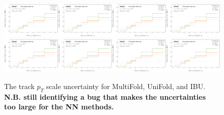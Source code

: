 \begin{figure}[h!]
\includegraphics[width=0.25\textwidth,page=68]{figures/SimResults/TrackJet_SystEffect.pdf}\includegraphics[width=0.25\textwidth,page=72]{figures/SimResults/TrackJet_SystEffect.pdf}\includegraphics[width=0.25\textwidth,page=76]{figures/SimResults/TrackJet_SystEffect.pdf}\includegraphics[width=0.25\textwidth,page=80]{figures/SimResults/TrackJet_SystEffect.pdf}\\
\includegraphics[width=0.25\textwidth,page=84]{figures/SimResults/TrackJet_SystEffect.pdf}\includegraphics[width=0.25\textwidth,page=88]{figures/SimResults/TrackJet_SystEffect.pdf}\includegraphics[width=0.25\textwidth,page=92]{figures/SimResults/TrackJet_SystEffect.pdf}\includegraphics[width=0.25\textwidth,page=96]{figures/SimResults/TrackJet_SystEffect.pdf}
\caption{The track $p_T$ scale uncertainty for MultiFold, UniFold, and IBU.  \textbf{N.B. still identifying a bug that makes the uncertainties too large for the NN methods.}}
\label{fig:simresultsmulti_trackjetuncertsl4}
\end{figure}

